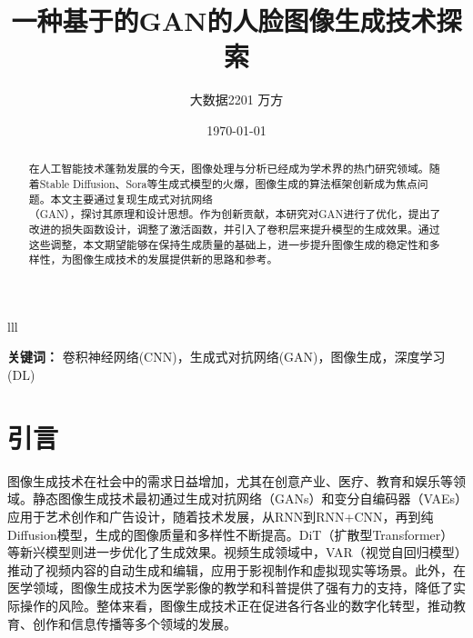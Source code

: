 \documentclass[UTF8]{ctexart}
\title{一种基于的GAN的人脸图像生成技术探索}
\author{大数据2201 万方}
\date{\today}
\providecommand{\keywords}[1]{
\small
\textbf{关键词：} #1
}
\begin{document}
\maketitle
lll
\begin{abstract}
在人工智能技术蓬勃发展的今天，图像处理与分析已经成为学术界的热门研究领域。随着Stable Diffusion、Sora等生成式模型的火爆，图像生成的算法框架创新成为焦点问题。本文主要通过复现生成式对抗网络\\（GAN），探讨其原理和设计思想。作为创新贡献，本研究对GAN进行了优化，提出了改进的损失函数设计，调整了激活函数，并引入了卷积层来提升模型的生成效果。通过这些调整，本文期望能够在保持生成质量的基础上，进一步提升图像生成的稳定性和多样性，为图像生成技术的发展提供新的思路和参考。
\end{abstract}
\keywords{卷积神经网络(CNN)，生成式对抗网络(GAN)，图像生成，深度学习(DL)}
\section{引言}
图像生成技术在社会中的需求日益增加，尤其在创意产业、医疗、教育和娱乐等领域。静态图像生成技术最初通过生成对抗网络（GANs）和变分自编码器（VAEs）应用于艺术创作和广告设计，随着技术发展，从RNN到RNN+CNN，再到纯Diffusion模型，生成的图像质量和多样性不断提高。DiT（扩散型Transformer）等新兴模型则进一步优化了生成效果。视频生成领域中，VAR（视觉自回归模型）推动了视频内容的自动生成和编辑，应用于影视制作和虚拟现实等场景。此外，在医学领域，图像生成技术为医学影像的教学和科普提供了强有力的支持，降低了实际操作的风险。整体来看，图像生成技术正在促进各行各业的数字化转型，推动教育、创作和信息传播等多个领域的发展。
\end{document}
